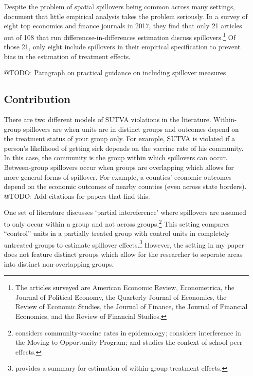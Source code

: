 \documentclass[11pt]{article}
\begin{document}
Despite the problem of spatial spillovers being common across many settings, \citet{Berg_Streitz_2019} document that little empirical analysis takes the problem seriously. In a survey of eight top economics and finance journals in 2017, they find that only 21 articles out of 108 that run differencse-in-differences estimation discuss spillovers.\footnote{The articles surveyed are American Economic Review, Econometrica, the Journal of Political Economy, the Quarterly Journal of Economics, the Review of Economic Studies, the Journal of Finance, the Journal of Financial Economics, and the Review of Financial Studies.} Of those 21, only eight include spillovers in their empirical specification to prevent bias in the estimation of treatment effects.

@TODO: Paragraph on practical guidance on including spillover measures

\subsection{Contribution}

There are two different models of SUTVA violations in the literature. Within-group spillovers are when units are in distinct groups and outcomes depend on the treatment status of your group only. For example, SUTVA is violated if a person's likelihood of getting sick depends on the vaccine rate of his community. In this case, the community is the group within which spillovers can occur. Between-group spillovers occur when groups are overlapping which allows for more general forms of spillover. For example, a counties' economic outcomes depend on the economic outcomes of nearby counties (even across state borders). @TODO: Add citations for papers that find this.

One set of literature discusses `partial intereference' where spillovers are assumed to only occur within a group and not across groups.\footnote{\citet{Halloran_Struchiner_1995} considers community-vaccine rates in epidemology; \citet{Sobel_2006} considers interference in the Moving to Opportunity Program; and \citet{Angrist_2014} studies the context of school peer effects.} This setting compares ``control'' units in a partially treated group with control units in completely untreated groups to estimate spillover effects.\footnote{\citet{Angelucci_DiMaro_2016} provides a summary for estimation of within-group treatment effects.} However, the setting in my paper does not feature distinct groups which allow for the researcher to seperate areas into distinct non-overlapping groups.
\end{document}
